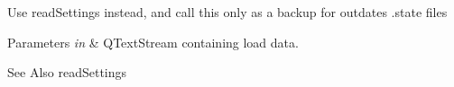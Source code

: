 
\begin{DoxyRefList}
\item[\label{deprecated__deprecated000001}%
\hypertarget{deprecated__deprecated000001}{}%
Member \hyperlink{classGlobalSearch_1_1Structure_aa9ede9f516912b34000000caa849689c}{Global\-Search\-:\-:Structure\-:\-:load} (Q\-Text\-Stream \&in)]Use read\-Settings instead, and call this only as a backup for outdates .state files 
\begin{DoxyParams}{Parameters}
{\em in} & Q\-Text\-Stream containing load data. \\
\hline
\end{DoxyParams}
\begin{DoxySeeAlso}{See Also}
read\-Settings 
\end{DoxySeeAlso}

\end{DoxyRefList}